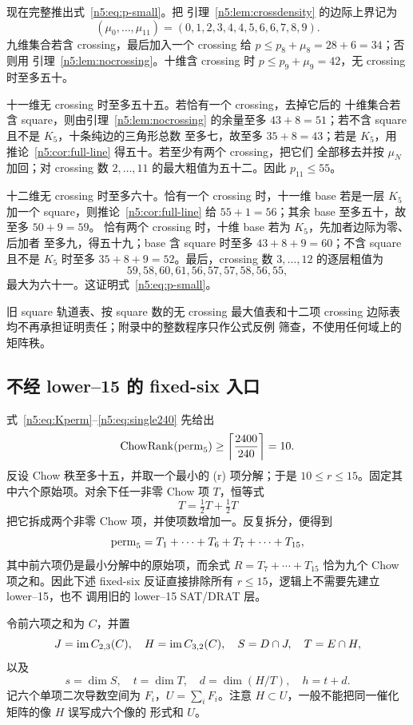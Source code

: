 现在完整推出式~\eqref{n5:eq:p-small}。把
引理~\ref{n5:lem:crossdensity} 的边际上界记为
\[
(\mu_0,\ldots,\mu_{11})=(0,1,2,3,4,4,5,6,6,7,8,9).
\]
九维集合若含 crossing，最后加入一个 crossing 给
\(p\le p_8+\mu_8=28+6=34\)；否则用
引理~\ref{n5:lem:nocrossing}。十维含 crossing 时
\(p\le p_9+\mu_9=42\)，无 crossing 时至多五十。

十一维无 crossing 时至多五十五。若恰有一个 crossing，去掉它后的
十维集合若含 square，则由引理~\ref{n5:lem:nocrossing} 的余量至多
\(43+8=51\)；若不含 square 且不是 \(K_5\)，十条纯边的三角形总数
至多七，故至多 \(35+8=43\)；若是 \(K_5\)，用
推论~\ref{n5:cor:full-line} 得五十。若至少有两个 crossing，把它们
全部移去并按 \(\mu_N\) 加回；对 crossing 数
\(2,\ldots,11\) 的最大粗值为五十二。因此 \(p_{11}\le55\)。

十二维无 crossing 时至多六十。恰有一个 crossing 时，十一维 base
若是一层 \(K_5\) 加一个 square，则推论~\ref{n5:cor:full-line} 给
\(55+1=56\)；其余 base 至多五十，故至多 \(50+9=59\)。
恰有两个 crossing 时，十维 base 若为 \(K_5\)，先加者边际为零、后加者
至多九，得五十九；base 含 square 时至多
\(43+8+9=60\)；不含 square 且不是 \(K_5\) 时至多
\(35+8+9=52\)。最后，crossing 数 \(3,\ldots,12\) 的逐层粗值为
\[
59,58,60,61,56,57,57,58,56,55,
\]
最大为六十一。这证明式~\eqref{n5:eq:p-small}。

旧 square 轨道表、按 square 数的无 crossing 最大值表和十二项
crossing 边际表均不再承担证明责任；附录中的整数程序只作公式反例
筛查，不使用任何域上的矩阵秩。

\subsection{不经 lower--15 的 fixed-six 入口}

式~\eqref{n5:eq:Kperm}--\eqref{n5:eq:single240} 先给出
\[
  \operatorname{ChowRank}(\operatorname{perm}_5)\ge\left\lceil\frac{2400}{240}\right\rceil=10.
\]
反设 Chow 秩至多十五，并取一个最小的 (r) 项分解；于是
\(10\le r\le15\)。固定其中六个原始项。对余下任一非零 Chow 项
\(T\)，恒等式
\[
 T=\tfrac12T+\tfrac12T
\]
把它拆成两个非零 Chow 项，并使项数增加一。反复拆分，便得到
\[
 \operatorname{perm}_5=T_1+\cdots+T_6+T_7+\cdots+T_{15},
\]
其中前六项仍是最小分解中的原始项，而余式
\(R=T_7+\cdots+T_{15}\) 恰为九个 Chow 项之和。因此下述 fixed-six
反证直接排除所有 \(r\le15\)，逻辑上不需要先建立 lower--15，也不
调用旧的 lower--15 SAT/DRAT 层。

令前六项之和为 \(C\)，并置
\[
 J=\operatorname{im} C_{2,3}(C),\quad H=\operatorname{im} C_{3,2}(C),\quad
 S=D\cap J,\quad T=E\cap H,
\]
以及
\[
 s=\dim S,\quad t=\dim T,\quad d=\dim(H/T),\quad h=t+d.
\]
记六个单项二次导数空间为 \(F_i\)，\(U=\sum_iF_i\)。注意
\(H\subset U\)，一般不能把同一催化矩阵的像 \(H\) 误写成六个像的
形式和 \(U\)。

